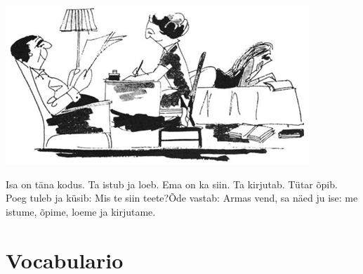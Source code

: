 \begin{center}
\includegraphics{img/L02.png}
\end{center}

Isa on täna kodus. Ta istub ja loeb. Ema on ka siin. Ta kirjutab. Tütar õpib. Poeg tuleb ja küsib: \guillemotleft Mis te siin teete?\guillemotright Õde vastab: \guillemotleft Armas vend, sa näed ju ise: me istume, õpime, loeme ja kirjutame.\guillemotright\\

\section*{\Large{Vocabulario}}

